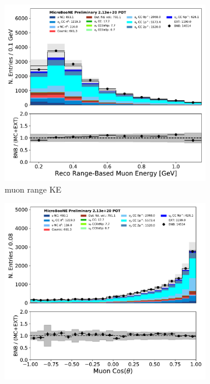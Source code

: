 \begin{figure}[H] 
\begin{center}
    \begin{subfigure}[b]{0.3\textwidth}
    \centering
    \includegraphics[width=1.00\textwidth]{NuMuCCsel/Images/Ryan/fullselection_run3_fullsystematics/trk_range_muon_e_v_07232020_fullsel_samples_detsys_event_category.pdf}
    \caption{\label{fig:detsys:numu:muonrange} muon range KE}
    \end{subfigure}
        \begin{subfigure}[b]{0.3\textwidth}
    \centering
    \includegraphics[width=1.00\textwidth]{NuMuCCsel/Images/Ryan/fullselection_run3_fullsystematics/trk_cos_theta_v_07232020_fullsel_samples_detsys_event_category.pdf}

\end{subfigure}
\end{center}
\end{figure}
